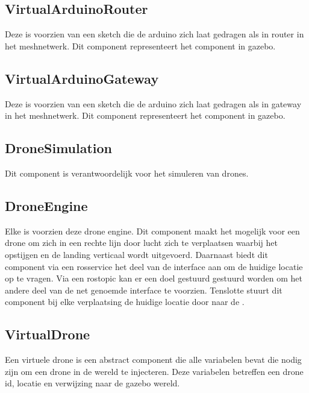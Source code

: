 \documentclass[a4paper, 11pt, oneside]{report}
\begin{document}
\subsection{VirtualArduinoRouter}
\label{architectural:subcomponenten:VirtualArduinoRouter}
Deze  is voorzien van een sketch die de arduino zich laat gedragen als in router in het meshnetwerk. Dit component representeert het component  in gazebo.

\subsection{VirtualArduinoGateway}
\label{architectural:subcomponenten:VirtualArduinoGateway}
Deze  is voorzien van een sketch die de arduino zich laat gedragen als in gateway in het meshnetwerk. Dit component representeert het component  in gazebo.


\subsection{DroneSimulation}
\label{architectural:subcomponenten:DroneSimulation}
Dit component is verantwoordelijk voor het simuleren van drones. 

\subsection{DroneEngine}
\label{architectural:subcomponenten:DroneEngine}
Elke  is voorzien deze drone engine. 
Dit component maakt het mogelijk voor een drone om zich in een rechte lijn door lucht zich te verplaatsen waarbij het opstijgen en de landing verticaal wordt uitgevoerd.
Daarnaast biedt dit component via een rosservice het deel van de interface  aan om de huidige locatie op te vragen.
Via een rostopic kan er een doel gestuurd gestuurd worden om het andere deel van de net genoemde interface te voorzien.
Tenslotte stuurt dit component bij elke verplaatsing de huidige locatie door naar de . 

\subsection{VirtualDrone}
\label{architectural:subcomponenten:VirtualDrone}
Een virtuele drone is een abstract component die alle variabelen bevat die nodig zijn om een drone in de wereld te injecteren. Deze variabelen betreffen een drone id, locatie en verwijzing naar de gazebo wereld. 
\end{document}
